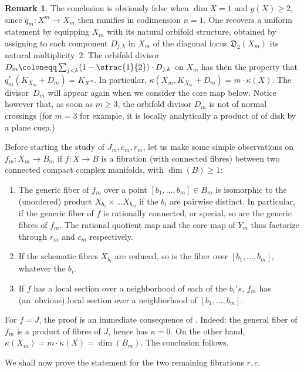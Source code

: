\documentclass[JEP,XML,SOM,Unicode, NoEqCountersInSection,NoFloatCountersInSection,published]{cedram}
\theoremstyle{theorem}
\theoremstyle{definition}
\newtheorem{remark}[proposition]{Remark}
\begin{document}
\begin{remark} \label{n=1} The conclusion is obviously false when $\dim X=1$ and $g(X) \geq 2$, since $q_m:X^m\to X_m$ then ramifies in codimension $n=1$. One recovers a uniform statement by equipping $X_m$ with its natural orbifold structure, obtained by assigning to each component $D_{j,k}$ in $X_m$ of the diagonal locus $\mathfrak{D}_2(X_m)$ its natural multiplicity~$2$. The orbifold divisor $D_m\coloneqq \sum_{j<k}(1-\sfrac{1}{2})\cdot D_{j,k}$ on $X_m$ has then the property that $q_m^*(K_{X_m}+D_m)=K_{X^m}$. In particular, $\kappa(X_m,K_{X_m}+D_m)=m\cdot\kappa(X)$. The divisor~$D_m$ will appear again when we consider the core map below. Notice however that, as soon as $m\geq 3$, the orbifold divisor $D_m$ is not of normal crossings (for $m=3$ for example, it is locally analytically a product of of disk by a plane cusp.) \end{remark}

Before starting the study of $J_m, c_m,r_m$, let us make some simple observations on $f_m:X_m\to B_m$ if $f:X\to B$ is a fibration (with connected fibres) between two connected compact complex manifolds, with $\dim(B)\geq 1$:

\begin{enumerate}
\item The generic fiber of $f_m$ over a point $[b_1,\dots,b_m]\in B_m$ is isomorphic to the (unordered) product $X_{b_1}\times\dots X_{b_m}$ if the $b_i$ are pairwise distinct. In particular, if the generic fiber of $f$ is rationally connected, or special, so are the generic fibres of $f_m$. The rational quotient map and the core map of $Y_m$ thus factorize through $r_m$ and $c_m$ respectively.

\item If the schematic fibres $X_{b_i}$ are reduced, so is the fiber over $[b_1,\dots,b_m]$, whatever the $b_i$.

\item If $f$ has a local section over a neighborhood of each of the $b_i's$, $f_m$ has (an~obvious) local section over a neighborhood of $[b_1,\dots,b_m]$.
\end{enumerate}

For $f=J$, the proof is an immediate consequence of \cite{AA02}. Indeed: the general fiber of $f_m$ is a product of fibres of $J$, hence has $\kappa=0$. On the other hand, $\kappa(X_m)=m\cdot \kappa(X)=\dim(B_m)$. The conclusion follows.

We shall now prove the statement for the two remaining fibrations $r,c$.
\end{document}
